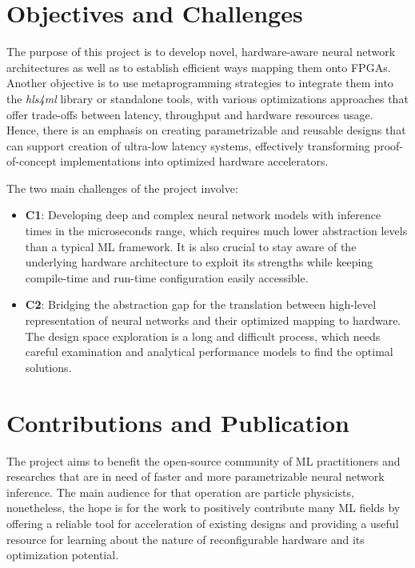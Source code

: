 \section{Objectives and Challenges}
The purpose of this project is to develop novel, hardware-aware neural network architectures as well as to establish efficient ways mapping them onto FPGAs. Another objective is to use metaprogramming strategies to integrate them into the \textit{hls4ml} library or standalone tools, with various optimizations approaches that offer trade-offs between latency, throughput and hardware resources usage. Hence, there is an emphasis on creating parametrizable and reusable designs that can support creation of ultra-low latency systems, effectively transforming proof-of-concept implementations into optimized hardware accelerators.

The two main challenges of the project involve:

\begin{itemize}
  \item \textbf{C1}: Developing deep and complex neural network models with inference times in the microseconds range, which requires much lower abstraction levels than a typical ML framework. It is also crucial to stay aware of the underlying hardware architecture to exploit its strengths while keeping compile-time and run-time configuration easily accessible.
  \item \textbf{C2}: Bridging the abstraction gap for the translation between high-level representation of neural networks and their optimized mapping to hardware. The design space exploration is a long and difficult process, which needs careful examination and analytical performance models to find the optimal solutions.
\end{itemize}


\section{Contributions and Publication}
The project aims to benefit the open-source community of ML practitioners and researches that are in need of faster and more parametrizable neural network inference. The main audience for that operation are particle physicists, nonetheless, the hope is for the work to positively contribute many ML fields by offering a reliable tool for acceleration of existing designs and providing a useful resource for learning about the nature of reconfigurable hardware and its optimization potential.

